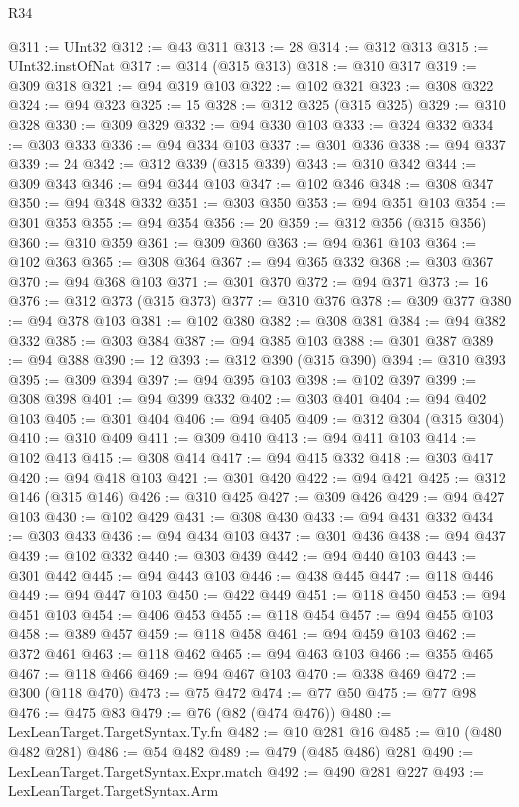 \begin{lexlean}{R34}
\begin{coremodule}
@311 := UInt32
@312 := @43 @311
@313 := 28
@314 := @312 @313
@315 := UInt32.instOfNat
@317 := @314 (@315 @313)
@318 := @310 @317
@319 := @309 @318
@321 := @94 @319 @103
@322 := @102 @321
@323 := @308 @322
@324 := @94 @323
@325 := 15
@328 := @312 @325 (@315 @325)
@329 := @310 @328
@330 := @309 @329
@332 := @94 @330 @103
@333 := @324 @332
@334 := @303 @333
@336 := @94 @334 @103
@337 := @301 @336
@338 := @94 @337
@339 := 24
@342 := @312 @339 (@315 @339)
@343 := @310 @342
@344 := @309 @343
@346 := @94 @344 @103
@347 := @102 @346
@348 := @308 @347
@350 := @94 @348 @332
@351 := @303 @350
@353 := @94 @351 @103
@354 := @301 @353
@355 := @94 @354
@356 := 20
@359 := @312 @356 (@315 @356)
@360 := @310 @359
@361 := @309 @360
@363 := @94 @361 @103
@364 := @102 @363
@365 := @308 @364
@367 := @94 @365 @332
@368 := @303 @367
@370 := @94 @368 @103
@371 := @301 @370
@372 := @94 @371
@373 := 16
@376 := @312 @373 (@315 @373)
@377 := @310 @376
@378 := @309 @377
@380 := @94 @378 @103
@381 := @102 @380
@382 := @308 @381
@384 := @94 @382 @332
@385 := @303 @384
@387 := @94 @385 @103
@388 := @301 @387
@389 := @94 @388
@390 := 12
@393 := @312 @390 (@315 @390)
@394 := @310 @393
@395 := @309 @394
@397 := @94 @395 @103
@398 := @102 @397
@399 := @308 @398
@401 := @94 @399 @332
@402 := @303 @401
@404 := @94 @402 @103
@405 := @301 @404
@406 := @94 @405
@409 := @312 @304 (@315 @304)
@410 := @310 @409
@411 := @309 @410
@413 := @94 @411 @103
@414 := @102 @413
@415 := @308 @414
@417 := @94 @415 @332
@418 := @303 @417
@420 := @94 @418 @103
@421 := @301 @420
@422 := @94 @421
@425 := @312 @146 (@315 @146)
@426 := @310 @425
@427 := @309 @426
@429 := @94 @427 @103
@430 := @102 @429
@431 := @308 @430
@433 := @94 @431 @332
@434 := @303 @433
@436 := @94 @434 @103
@437 := @301 @436
@438 := @94 @437
@439 := @102 @332
@440 := @303 @439
@442 := @94 @440 @103
@443 := @301 @442
@445 := @94 @443 @103
@446 := @438 @445
@447 := @118 @446
@449 := @94 @447 @103
@450 := @422 @449
@451 := @118 @450
@453 := @94 @451 @103
@454 := @406 @453
@455 := @118 @454
@457 := @94 @455 @103
@458 := @389 @457
@459 := @118 @458
@461 := @94 @459 @103
@462 := @372 @461
@463 := @118 @462
@465 := @94 @463 @103
@466 := @355 @465
@467 := @118 @466
@469 := @94 @467 @103
@470 := @338 @469
@472 := @300 (@118 @470)
@473 := @75 @472
@474 := @77 @50
@475 := @77 @98
@476 := @475 @83
@479 := @76 (@82 (@474 @476))
@480 := LexLeanTarget.TargetSyntax.Ty.fn
@482 := @10 @281 @16
@485 := @10 (@480 @482 @281)
@486 := @54 @482
@489 := @479 (@485 @486) @281
@490 := LexLeanTarget.TargetSyntax.Expr.match
@492 := @490 @281 @227
@493 := LexLeanTarget.TargetSyntax.Arm

\end{coremodule}
\end{lexlean}
